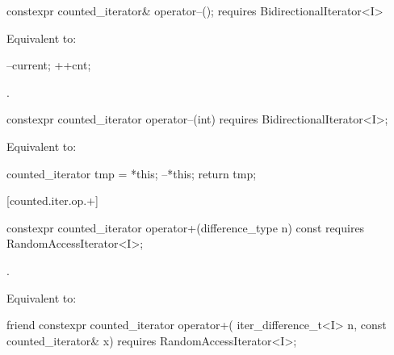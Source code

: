 \begin{addedblock}
%
%
\begin{itemdecl}
  constexpr counted_iterator& operator--();
    requires BidirectionalIterator<I>
\end{itemdecl}

\begin{itemdescr}
\pnum
\effects Equivalent to:
\begin{codeblock}
--current;
++cnt;
\end{codeblock}

\pnum
\returns {}.
\end{itemdescr}

%
%
\begin{itemdecl}
  constexpr counted_iterator operator--(int)
    requires BidirectionalIterator<I>;
\end{itemdecl}

\begin{itemdescr}
\pnum
\effects Equivalent to:
\begin{codeblock}
counted_iterator tmp = *this;
--*this;
return tmp;
\end{codeblock}
\end{itemdescr}

[counted.iter.op.+]{}

%
%
\begin{itemdecl}
  constexpr counted_iterator operator+(difference_type n) const
    requires RandomAccessIterator<I>;
\end{itemdecl}

\begin{itemdescr}
\pnum
\expects {}.

\pnum
\effects Equivalent to: 
\end{itemdescr}

%
%
\begin{itemdecl}
friend constexpr counted_iterator operator+(
  iter_difference_t<I> n, const counted_iterator& x)
    requires RandomAccessIterator<I>;
\end{itemdecl}


\end{addedblock}
